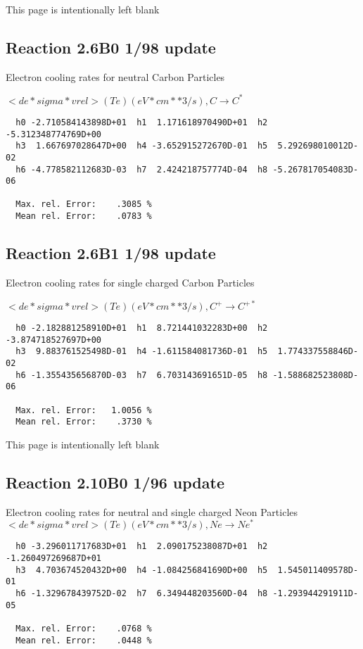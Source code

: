 \newpage
This page is intentionally left blank
\newpage

\subsection{
Reaction 2.6B0                     1/98 update
}

 Electron cooling rates for neutral
 Carbon Particles

$ <de*sigma*vrel>(Te)  (eV*cm**3/s), C   \rightarrow C^* $


\begin{verbatim}
  h0 -2.710584143898D+01  h1  1.171618970490D+01  h2 -5.312348774769D+00
  h3  1.667697028647D+00  h4 -3.652915272670D-01  h5  5.292698010012D-02
  h6 -4.778582112683D-03  h7  2.424218757774D-04  h8 -5.267817054083D-06

  Max. rel. Error:    .3085 %
  Mean rel. Error:    .0783 %

\end{verbatim}

\subsection{
Reaction 2.6B1                     1/98 update
}

 Electron cooling rates for single
 charged Carbon Particles

 $<de*sigma*vrel>(Te)  (eV*cm**3/s), C^+ \rightarrow C^{+*} $


\begin{verbatim}
  h0 -2.182881258910D+01  h1  8.721441032283D+00  h2 -3.874718527697D+00
  h3  9.883761525498D-01  h4 -1.611584081736D-01  h5  1.774337558846D-02
  h6 -1.355435656870D-03  h7  6.703143691651D-05  h8 -1.588682523808D-06

  Max. rel. Error:   1.0056 %
  Mean rel. Error:    .3730 %

\end{verbatim}

\newpage
This page is intentionally left blank
\newpage

\subsection{
Reaction 2.10B0                   1/96 update
}

  Electron cooling rates for neutral and single
  charged Neon Particles
 $<de*sigma*vrel>(Te)  (eV*cm**3/s), Ne  \rightarrow  Ne^*$

\begin{verbatim}
  h0 -3.296011717683D+01  h1  2.090175238087D+01  h2 -1.260497269687D+01
  h3  4.703674520432D+00  h4 -1.084256841690D+00  h5  1.545011409578D-01
  h6 -1.329678439752D-02  h7  6.349448203560D-04  h8 -1.293944291911D-05

  Max. rel. Error:    .0768 %
  Mean rel. Error:    .0448 %


\end{verbatim}


